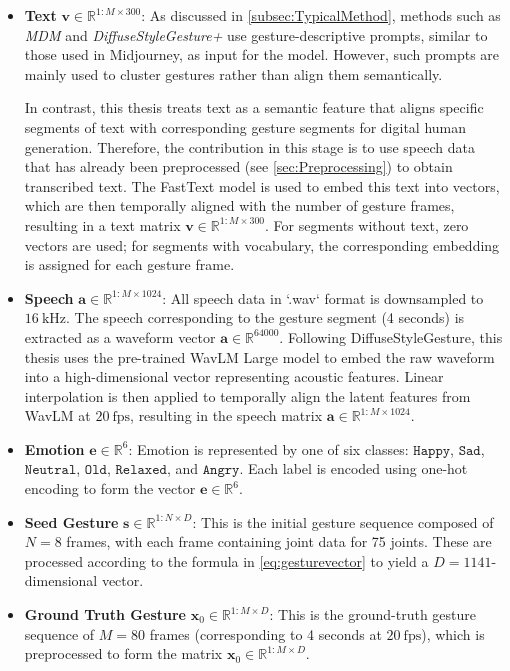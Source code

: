 \begin{itemize}
	\item \textbf{Text} $\mathbf{v} \in \mathbb{R}^{1:M \times 300}$:  
	As discussed in \autoref{subsec:TypicalMethod}, methods such as \textit{MDM} \cite{tevet2022human} and \textit{DiffuseStyleGesture+} \cite{yang2022DiffuseStyleGestureplus} use gesture-descriptive prompts, similar to those used in Midjourney, as input for the model. However, such prompts are mainly used to cluster gestures rather than align them semantically. 
	
	In contrast, this thesis treats text as a semantic feature that aligns specific segments of text with corresponding gesture segments for digital human generation. Therefore, the contribution in this stage is to use speech data that has already been preprocessed (see \autoref{sec:Preprocessing}) to obtain transcribed text. The FastText model \cite{bojanowski2017enriching} is used to embed this text into vectors, which are then temporally aligned with the number of gesture frames, resulting in a text matrix $\mathbf{v} \in \mathbb{R}^{1:M \times 300}$. For segments without text, zero vectors are used; for segments with vocabulary, the corresponding embedding is assigned for each gesture frame.
	
	\item \textbf{Speech} $\mathbf{a} \in \mathbb{R}^{1:M \times 1024}$:  
	All speech data in `.wav` format is downsampled to $16~\mathrm{kHz}$. The speech corresponding to the gesture segment (4 seconds) is extracted as a waveform vector $\mathbf{a} \in \mathbb{R}^{64000}$. Following DiffuseStyleGesture, this thesis uses the pre-trained WavLM Large model \cite{Chen_2022} to embed the raw waveform into a high-dimensional vector representing acoustic features. Linear interpolation is then applied to temporally align the latent features from WavLM at $20~\text{fps}$, resulting in the speech matrix $\mathbf{a} \in \mathbb{R}^{1:M \times 1024}$.
	
	\item \textbf{Emotion} $\mathbf{e} \in \mathbb{R}^{6}$:  
	Emotion is represented by one of six classes: $\texttt{Happy}$, $\texttt{Sad}$, $\texttt{Neutral}$, $\texttt{Old}$, $\texttt{Relaxed}$, and $\texttt{Angry}$.  
	Each label is encoded using one-hot encoding to form the vector $\mathbf{e} \in \mathbb{R}^{6}$.
	
	\item \textbf{Seed Gesture} $\mathbf{s} \in \mathbb{R}^{1:N \times D}$:  
	This is the initial gesture sequence composed of $N=8$ frames, with each frame containing joint data for 75 joints. These are processed according to the formula in \autoref{eq:gesturevector} to yield a $D=1141$-dimensional vector.
	
	\item \textbf{Ground Truth Gesture} $\mathbf{x}_{0} \in \mathbb{R}^{1:M \times D}$:  
	This is the ground-truth gesture sequence of $M = 80$ frames (corresponding to 4 seconds at $20~\text{fps}$), which is preprocessed to form the matrix $\mathbf{x}_{0} \in \mathbb{R}^{1:M \times D}$.
\end{itemize}

